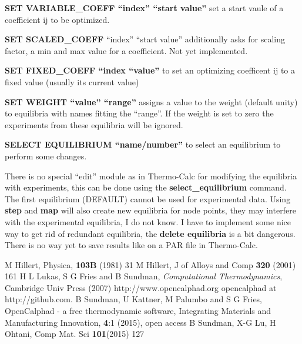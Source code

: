 \documentclass[12pt]{article}
\begin{document}
\begin{description}
\item{\bf SET VARIABLE\_COEFF ``index'' ``start value''} set a start
  vaule of a coefficient ij to be optimized.

\item{\bf SET SCALED\_COEFF} ``index'' ``start value'' additionally
  asks for scaling factor, a min and max value for a coefficient.  Not
  yet implemented.

\item{\bf SET FIXED\_COEFF ``index ``value''} to set an optimizing
  coefficent ij to a fixed value (usually its current value)

\item{\bf SET WEIGHT ``value'' ``range''} assigns a value to the
  weight (default unity) to equilibria with names fitting the
  ``range''.  If the weight is set to zero the experiments from these
  equilibria will be ignored.

\item{\bf SELECT EQUILIBRIUM ``name/number''} to select an equilibrium
  to perform some changes.

\end{description}

There is no special ``edit'' module as in Thermo-Calc for modifying
the equilibria with experiments, this can be done using the {\bf
  select\_equilibrium} command. The first equilibrium (DEFAULT) cannot
be used for experimental data.  Using {\bf step} and {\bf map} will
also create new equilibria for node points, they may interfere with
the experimental equilibria, I do not know.  I have to implement some
nice way to get rid of redundant equilibria, the {\bf delete
  equilibria} is a bit dangerous.  There is no way yet to save results
like on a PAR file in Thermo-Calc.

\begin{thebibliography}{77Zzz}
 M Hillert, Physica, {\bf 103B} (1981) 31
 M Hillert, J of Alloys and Comp {\bf 320} (2001) 161
 H L Lukas, S G Fries and B Sundman, {\em Computational
Thermodynamics}, Cambridge Univ Press (2007)
 http://www.opencalphad.org
 opencalphad at http://github.com.  
 B Sundman, U Kattner, M Palumbo and S G
  Fries, OpenCalphad - a free thermodynamic software, Integrating
  Materials and Manufacturing Innovation, {\bf 4}:1 (2015), open
  access
 B Sundman, X-G Lu, H Ohtani, Comp Mat. Sci
  {\bf 101}(2015) 127
\end{thebibliography}
\end{document}

